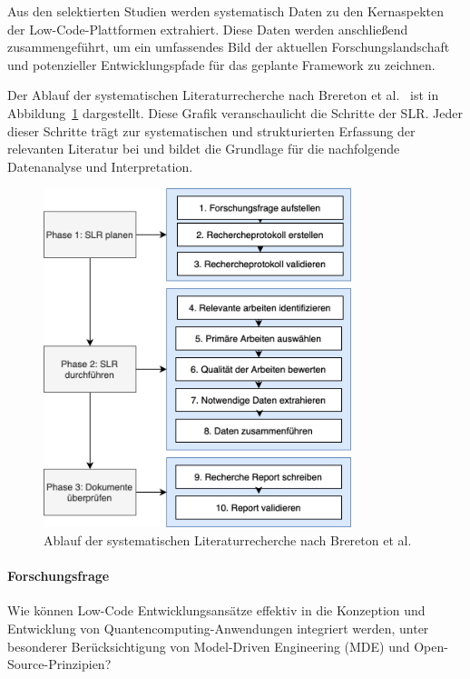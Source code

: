 Aus den selektierten Studien werden systematisch Daten zu den Kernaspekten der 
Low-Code-Plattformen extrahiert. Diese Daten werden anschließend zusammengeführt, um ein 
umfassendes Bild der aktuellen Forschungslandschaft und potenzieller Entwicklungspfade für 
das geplante Framework zu zeichnen.

Der Ablauf der systematischen Literaturrecherche nach Brereton et al.~\cite{brereton2007lessons} 
ist in Abbildung~\ref{fig:slr_kitchenham} dargestellt. 
Diese Grafik veranschaulicht die Schritte der SLR. Jeder dieser Schritte trägt zur systematischen und 
strukturierten Erfassung der relevanten Literatur bei und bildet die Grundlage für die nachfolgende 
Datenanalyse und Interpretation.

\begin{figure}[h!]
    \centering
    \includegraphics[width=0.8\textwidth]{graphics/slr_kitchenham_ablauf.png}
    \caption{Ablauf der systematischen Literaturrecherche nach Brereton et al.~\cite{brereton2007lessons}}
    \label{fig:slr_kitchenham}
\end{figure}

\paragraph{Forschungsfrage}
Wie können Low-Code Entwicklungsansätze effektiv in die Konzeption und Entwicklung von Quantencomputing-Anwendungen 
integriert werden, unter besonderer Berücksichtigung von Model-Driven Engineering (MDE) und Open-Source-Prinzipien?

